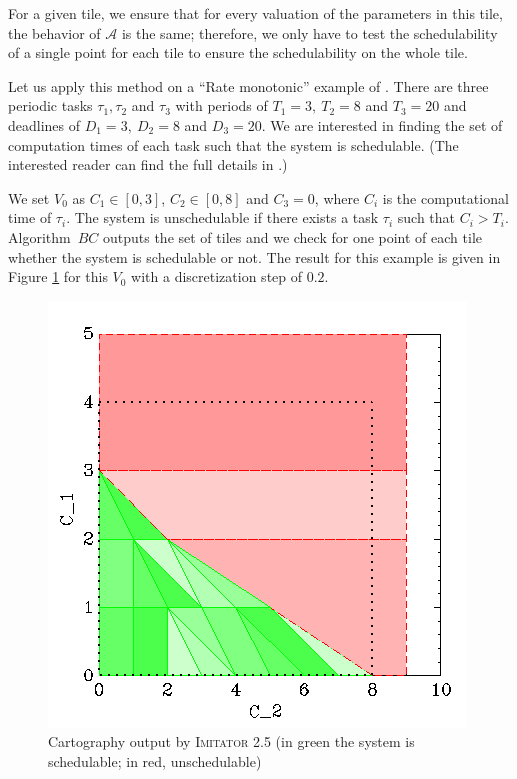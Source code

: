 \documentclass{llncs}
\newcommand{\A}{\mathcal{A}}
\newcommand{\IM}{\mathit{IM}}
\newcommand{\BC}{\mathit{BC}}
\newcommand{\imitator}{\textsc{Imitator}}
\begin{document}
For a given tile, we ensure that for every valuation of the parameters in this tile, the behavior of $\A$ is the same;
therefore, we only have to test the schedulability of a single point for each tile to ensure the schedulability on the whole tile.

Let us apply this method on a ``Rate monotonic'' example of \cite[Section~III]{bb04}.
There are three periodic tasks $\tau_1, \tau_2$ and $\tau_3$ with periods of $T_1 = 3, \ T_2 = 8$ and $T_3 = 20$ and deadlines of $D_1 = 3, \ D_2 = 8$ and $D_3 = 20$.
We are interested in finding the set of computation times of each task such that the system is schedulable.
(The interested reader can find the full details in \cite{bb04}.)

We set $V_0$ as $C_1 \in [0,3]$, $C_2 \in [0,8]$ and $C_3 = 0$, where $C_i$ is the computational time of $\tau_i$. The system is unschedulable if there exists a task $\tau_i$ such that $C_i > T_i$. 
Algorithm~$\BC$ outputs the set of tiles and we check for one point of each tile whether the system is schedulable or not.
The result for this example is given in Figure \ref{fig:carto} for this $V_0$ with a discretization step of $0.2$.

\begin{figure}[!ht]
	\centering
	\includegraphics[scale = 0.5]{./figures/C1-C2.png}
	\caption{Cartography output by \imitator{} 2.5 (in green the system is schedulable; in red, unschedulable)}
	\label{fig:carto}
\end{figure}
\end{document}
